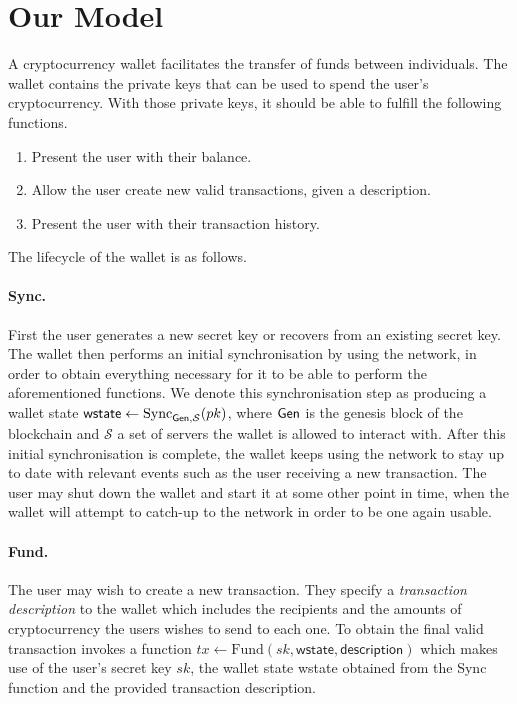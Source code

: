 \section{Our Model}
\label{model}
A cryptocurrency wallet facilitates the transfer of funds between individuals. The wallet contains the private keys that can be used to spend the user's cryptocurrency. With those private keys, it should be able to fulfill the following functions.

\begin{enumerate}
    \item Present the user with their balance.
    \item Allow the user create new valid transactions, given a description.
    \item Present the user with their transaction history.
\end{enumerate}

The lifecycle of the wallet is as follows.
\paragraph{Sync.}
First the user generates a new secret key or recovers from an existing secret key. The wallet then performs an initial synchronisation by using the network, in order to obtain everything necessary for it to be able to perform the aforementioned functions. We denote this synchronisation step as producing a wallet state $\textsf{wstate} \gets \text{Sync}_{\textsf{Gen}, \mathcal{S}}(pk)$, where $\textsf{Gen}$ is the genesis block of the blockchain and $\mathcal{S}$ a set of servers the wallet is allowed to interact with. After this initial synchronisation is complete, the wallet keeps using the network to stay up to date with relevant events such as the user receiving a new transaction. The user may shut down the wallet and start it at some other point in time, when the wallet will attempt to catch-up to the network in order to be one again usable.

\paragraph{Fund.}
The user may wish to create a new transaction. They specify a \emph{transaction description} to the wallet which includes the recipients and the amounts of cryptocurrency the users wishes to send to each one. To obtain the final valid transaction invokes a function $tx \gets \text{Fund}(sk, \textsf{wstate}, \textsf{description})$ which makes use of the user's secret key $sk$, the wallet state \textsf{wstate} obtained from the Sync function and the provided transaction \textsf{description}.

